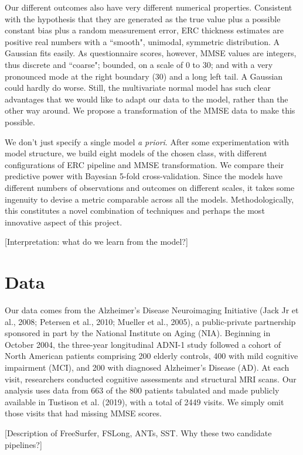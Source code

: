 \documentclass[12pt]{article}
\begin{document}
Our different outcomes also have very different numerical properties. Consistent with the hypothesis that they are generated as the true value plus a possible constant bias plus a random measurement error, ERC thickness estimates are positive real numbers with a ``smooth", unimodal, symmetric distribution. A Gaussian fits easily. As questionnaire scores, however, MMSE values are integers, thus discrete and ``coarse"; bounded, on a scale of 0 to 30; and with a very pronounced mode at the right boundary (30) and a long left tail. A Gaussian could hardly do worse. Still, the multivariate normal model has such clear advantages that we would like to adapt our data to the model, rather than the other way around. We propose a transformation of the MMSE data to make this possible. 

We don't just specify a single model \textit{a priori}. After some experimentation with model structure, we build eight models of the chosen class, with different configurations of ERC pipeline and MMSE transformation. We compare their predictive power with Bayesian 5-fold cross-validation. Since the models have different numbers of observations and outcomes on different scales, it takes some ingenuity to devise a metric comparable across all the models. Methodologically, this constitutes a novel combination of techniques and perhaps the most innovative aspect of this project. 

{\color{teal} [Interpretation: what do we learn from the model?]}

\section{Data}

Our data comes from the Alzheimer's Disease Neuroimaging Initiative (Jack Jr et al., 2008; Petersen et al., 2010; Mueller et al., 2005), a public-private partnership sponsored in part by the National Institute on Aging (NIA). Beginning in October 2004, the three-year longitudinal ADNI-1 study followed a cohort of North American patients comprising 200 elderly controls, 400 with mild cognitive impairment (MCI), and 200 with diagnosed Alzheimer's Disease (AD). At each visit, researchers conducted cognitive assessments and structural MRI scans. Our analysis uses data from 663 of the 800 patients tabulated and made publicly available in Tustison et al. (2019), with a total of 2449 visits. We simply omit those visits that had missing MMSE scores.

{\color{teal} [Description of FreeSurfer, FSLong, ANTs, SST. Why these two candidate pipelines?]}
\end{document}
